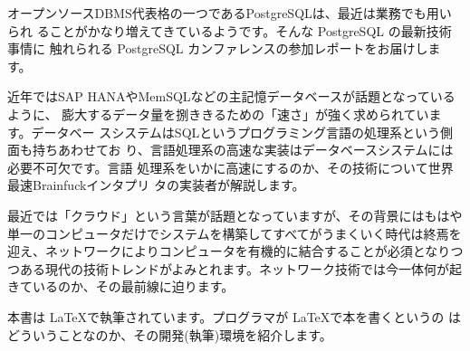 オープンソースDBMS代表格の一つであるPostgreSQLは、最近は業務でも用いられ
ることがかなり増えてきているようです。そんな PostgreSQL の最新技術事情に
触れられる PostgreSQL カンファレンスの参加レポートをお届けします。

\vspace*{\Cvs}


近年ではSAP HANAやMemSQLなどの主記憶データベースが話題となっているように、
膨大するデータ量を捌ききるための「速さ」が強く求められています。データベー
スシステムはSQLというプログラミング言語の処理系という側面も持ちあわせてお
り、言語処理系の高速な実装はデータベースシステムには必要不可欠です。言語
処理系をいかに高速にするのか、その技術について世界最速Brainfuckインタプリ
タの実装者が解説します。

\vspace*{\Cvs}



最近では「クラウド」という言葉が話題となっていますが、その背景にはもはや
単一のコンピュータだけでシステムを構築してすべてがうまくいく時代は終焉を
迎え、ネットワークによりコンピュータを有機的に結合することが必須となりつ
つある現代の技術トレンドがよみとれます。ネットワーク技術では今一体何が起
きているのか、その最前線に迫ります。

\vspace*{\Cvs}


本書は \LaTeX で執筆されています。プログラマが \LaTeX で本を書くというの
はどういうことなのか、その開発(執筆)環境を紹介します。


\thispagestyle{plainhead}
